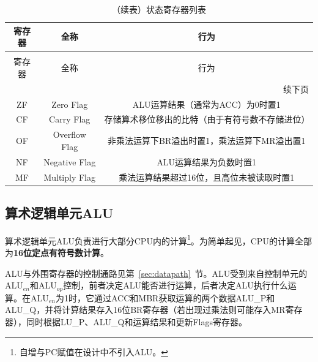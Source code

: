 \documentclass[lang=cn,a4paper,newtx]{elegantpaper}
\begin{document}
\begin{longtable}{c c c}
  \caption{状态寄存器列表} \label{tab:CPU:status} \\
  \toprule
  寄存器 & 全称 & 行为 \\ 
  \midrule
  \endfirsthead

  \caption[]{（续表）状态寄存器列表} \\
  \toprule
  寄存器 & 全称 & 行为\\
  \midrule
  \endhead

  \midrule
  \multicolumn{3}{r}{续下页} \\
  \midrule
  \endfoot

  \bottomrule
  \endlastfoot

  ZF   & Zero Flag             & ALU运算结果（通常为ACC）为0时置1\\
  CF  & Carry Flag     & 存储算术移位移出的比特（由于有符号数不存储进位）\\
  OF  & Overflow Flag &  非乘法运算下BR溢出时置1，乘法运算下MR溢出置1\\
  NF  & Negative Flag &  ALU运算结果为负数时置1\\
  MF & Multiply Flag & 乘法运算结果超过16位，且高位未被读取时置1\\
\end{longtable}
\subsection{算术逻辑单元ALU}
算术逻辑单元ALU负责进行大部分CPU内的计算\footnote{自增与PC赋值在设计中不引入ALU。}。为简单起见，CPU的计算全部为\textbf{16位定点有符号数计算}。

ALU与外围寄存器的控制通路见第~\ref{sec:datapath}~节。ALU受到来自控制单元的$\text{ALU}_{en}$和$\text{ALU}_{op}$控制，前者决定ALU能否进行运算，后者决定ALU执行什么运算。在$\text{ALU}_{en}$为1时，它通过ACC和MBR获取运算的两个数据ALU\_P和ALU\_Q，并将计算结果存入16位BR寄存器（若出现过乘法则可能存入MR寄存器），同时根据LU\_P、ALU\_Q和运算结果和更新Flags寄存器。
\end{document}
